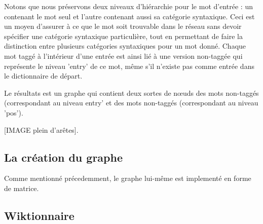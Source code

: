Notons que nous préservons deux niveaux d'hiérarchie pour le mot d'entrée : un 
contenant le mot seul et l'autre contenant aussi sa catégorie syntaxique. Ceci 
est un moyen d'assurer à ce que le mot soit trouvable dans le réseau sans devoir 
spécifier une catégorie syntaxique particulière, tout en permettant de faire la 
distinction entre plusieurs catégories syntaxiques pour un mot donné. Chaque mot 
taggé à l'intérieur d'une entrée est ainsi lié à une version non-taggée qui 
représente le niveau 'entry' de ce mot, même s'il n'existe pas comme entrée dans 
le dictionnaire de départ.

Le résultats est un graphe qui contient deux sortes de nœuds des mots non-taggés 
(correspondant au niveau entry' et des mots non-taggés (correspondant au niveau 
'pos').

[IMAGE plein d'arêtes].

\subsection{La création du graphe}
Comme mentionné précedemment, le graphe lui-même est implementé en forme de 
matrice.

\subsection{Wiktionnaire}
